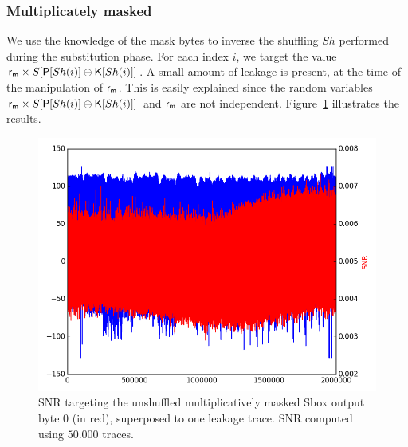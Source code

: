\subsubsection{Multiplicately masked}
We use the knowledge of the mask bytes to inverse the shuffling $Sh$ performed during the substitution phase. For each index $i$, we target the value $\mathsf{r_m} \times S[\mathsf{P}[Sh(i)]\oplus \mathsf{K}[Sh(i)]]$. A small amount of leakage is present, at the time of the manipulation of $\mathsf{r_m}$. This is easily explained since the random variables $\mathsf{r_m} \times S[\mathsf{P}[Sh(i)]\oplus \mathsf{K}[Sh(i)]]$ and $\mathsf{r_m}$ are not independent. 
Figure~\ref{fig:SNR_unshuffledaS0} illustrates the results.
\begin{figure}[H]
	\centering 
	\includegraphics[scale=0.35]{figures/2Mpts/SNR_unshuffled_aS0_50ktraces.png}
	\caption{SNR targeting the unshuffled multiplicatively masked Sbox output byte 0 (in red), superposed to one leakage trace. SNR computed using $50.000$ traces.}
	\label{fig:SNR_unshuffledaS0}
\end{figure}

